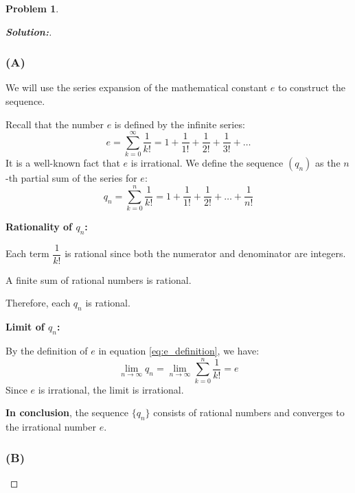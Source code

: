 \documentclass[12pt]{article}
\theoremstyle{definition}\newtheorem{problem}{Problem}
\newenvironment{solution}{\begin{proof}[\bfseries\textup{Solution:}]}{\end{proof}}
\begin{document}
\newpage
\begin{problem}
\end{problem}
\begin{solution}

\subsubsection*{(A)}


We will use the series expansion of the mathematical constant $e$ to construct the sequence.

Recall that the number $e$ is defined by the infinite series:
    \begin{equation}\label{eq:e_definition}
    e = \sum_{k=0}^{\infty} \frac{1}{k!} = 1 + \frac{1}{1!} + \frac{1}{2!} + \frac{1}{3!} + \dots
    \end{equation}
    It is a well-known fact that $e$ is irrational.
 We define the sequence $(q_n)$ as the $n$-th partial sum of the series for $e$:
    \begin{equation}\label{eq:q_n_definition}
    q_n = \sum_{k=0}^{n} \frac{1}{k!} = 1 + \frac{1}{1!} + \frac{1}{2!} + \dots + \frac{1}{n!}
    \end{equation}

\textbf{Rationality of $q_n$:}

 Each term $\dfrac{1}{k!}$ is rational since both the numerator and denominator are integers.

 A finite sum of rational numbers is rational.

 Therefore, each $q_n$ is rational.


\textbf{Limit of $q_n$:}

 By the definition of $e$ in equation \eqref{eq:e_definition}, we have:
        \begin{equation*}
        \lim_{n \to \infty} q_n = \lim_{n \to \infty} \sum_{k=0}^{n} \frac{1}{k!} = e
        \end{equation*}
Since $e$ is irrational, the limit is irrational.

\textbf{In conclusion}, the sequence $\{q_n\}$ consists of rational numbers and converges to the irrational number $e$.

\bigskip

\subsubsection*{(B)}



\end{solution}
\end{document}
